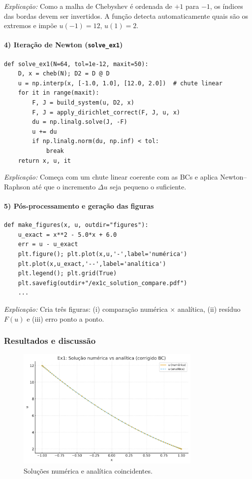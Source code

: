 \documentclass[12pt,a4paper]{article}
\begin{document}
\noindent
\textit{Explicação:}  
Como a malha de Chebyshev é ordenada de \(+1\) para \(-1\), os índices das bordas devem ser invertidos.  
A função detecta automaticamente quais são os extremos e impõe \(u(-1)=12\), \(u(1)=2\).

\paragraph{4) Iteração de Newton (\texttt{solve\_ex1})}
\begin{verbatim}
def solve_ex1(N=64, tol=1e-12, maxit=50):
    D, x = cheb(N); D2 = D @ D
    u = np.interp(x, [-1.0, 1.0], [12.0, 2.0])  # chute linear
    for it in range(maxit):
        F, J = build_system(u, D2, x)
        F, J = apply_dirichlet_correct(F, J, u, x)
        du = np.linalg.solve(J, -F)
        u += du
        if np.linalg.norm(du, np.inf) < tol:
            break
    return x, u, it
\end{verbatim}

\noindent
\textit{Explicação:}  
Começa com um chute linear coerente com as BCs e aplica Newton–Raphson até que o incremento \(\Delta u\) seja pequeno o suficiente.

\paragraph{5) Pós-processamento e geração das figuras}
\begin{verbatim}
def make_figures(x, u, outdir="figures"):
    u_exact = x**2 - 5.0*x + 6.0
    err = u - u_exact
    plt.figure(); plt.plot(x,u,'-',label='numérica')
    plt.plot(x,u_exact,'--',label='analítica')
    plt.legend(); plt.grid(True)
    plt.savefig(outdir+"/ex1c_solution_compare.pdf")
    ...
\end{verbatim}

\noindent
\textit{Explicação:}  
Cria três figuras: (i) comparação numérica × analítica, (ii) resíduo \(F(u)\) e (iii) erro ponto a ponto.

\subsubsection*{Resultados e discussão}
\begin{figure}[h!]
\centering
\includegraphics[width=0.8\textwidth]{figures/ex1c_solution_compare.pdf}
\caption{Soluções numérica e analítica coincidentes.}
\end{figure}
\end{document}
